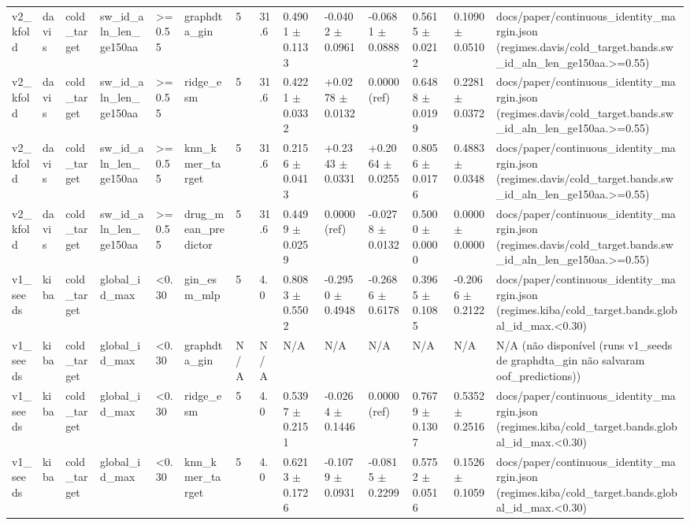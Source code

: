 \begin{table}[htbp]
\begin{tabular}{llllllllllllll}
v2\_kfold & davis & cold\_target & sw\_id\_aln\_len\_ge150aa & >=0.55 & graphdta\_gin & 5 & 31.6 & 0.4901 $\pm$ 0.1133 & -0.0402 $\pm$ 0.0961 & -0.0681 $\pm$ 0.0888 & 0.5615 $\pm$ 0.0212 & 0.1090 $\pm$ 0.0510 & docs/paper/continuous\_identity\_margin.json (regimes.davis/cold\_target.bands.sw\_id\_aln\_len\_ge150aa.>=0.55) \\
v2\_kfold & davis & cold\_target & sw\_id\_aln\_len\_ge150aa & >=0.55 & ridge\_esm & 5 & 31.6 & 0.4221 $\pm$ 0.0332 & +0.0278 $\pm$ 0.0132 & 0.0000 (ref) & 0.6488 $\pm$ 0.0199 & 0.2281 $\pm$ 0.0372 & docs/paper/continuous\_identity\_margin.json (regimes.davis/cold\_target.bands.sw\_id\_aln\_len\_ge150aa.>=0.55) \\
v2\_kfold & davis & cold\_target & sw\_id\_aln\_len\_ge150aa & >=0.55 & knn\_kmer\_target & 5 & 31.6 & 0.2156 $\pm$ 0.0413 & +0.2343 $\pm$ 0.0331 & +0.2064 $\pm$ 0.0255 & 0.8056 $\pm$ 0.0176 & 0.4883 $\pm$ 0.0348 & docs/paper/continuous\_identity\_margin.json (regimes.davis/cold\_target.bands.sw\_id\_aln\_len\_ge150aa.>=0.55) \\
v2\_kfold & davis & cold\_target & sw\_id\_aln\_len\_ge150aa & >=0.55 & drug\_mean\_predictor & 5 & 31.6 & 0.4499 $\pm$ 0.0259 & 0.0000 (ref) & -0.0278 $\pm$ 0.0132 & 0.5000 $\pm$ 0.0000 & 0.0000 $\pm$ 0.0000 & docs/paper/continuous\_identity\_margin.json (regimes.davis/cold\_target.bands.sw\_id\_aln\_len\_ge150aa.>=0.55) \\
v1\_seeds & kiba & cold\_target & global\_id\_max & <0.30 & gin\_esm\_mlp & 5 & 4.0 & 0.8083 $\pm$ 0.5502 & -0.2950 $\pm$ 0.4948 & -0.2686 $\pm$ 0.6178 & 0.3965 $\pm$ 0.1085 & -0.2066 $\pm$ 0.2122 & docs/paper/continuous\_identity\_margin.json (regimes.kiba/cold\_target.bands.global\_id\_max.<0.30) \\
v1\_seeds & kiba & cold\_target & global\_id\_max & <0.30 & graphdta\_gin & N/A & N/A & N/A & N/A & N/A & N/A & N/A & N/A (não disponível (runs v1\_seeds de graphdta\_gin não salvaram oof\_predictions)) \\
v1\_seeds & kiba & cold\_target & global\_id\_max & <0.30 & ridge\_esm & 5 & 4.0 & 0.5397 $\pm$ 0.2151 & -0.0264 $\pm$ 0.1446 & 0.0000 (ref) & 0.7679 $\pm$ 0.1307 & 0.5352 $\pm$ 0.2516 & docs/paper/continuous\_identity\_margin.json (regimes.kiba/cold\_target.bands.global\_id\_max.<0.30) \\
v1\_seeds & kiba & cold\_target & global\_id\_max & <0.30 & knn\_kmer\_target & 5 & 4.0 & 0.6213 $\pm$ 0.1726 & -0.1079 $\pm$ 0.0931 & -0.0815 $\pm$ 0.2299 & 0.5752 $\pm$ 0.0516 & 0.1526 $\pm$ 0.1059 & docs/paper/continuous\_identity\_margin.json (regimes.kiba/cold\_target.bands.global\_id\_max.<0.30) \\

\end{tabular}
\end{table}
